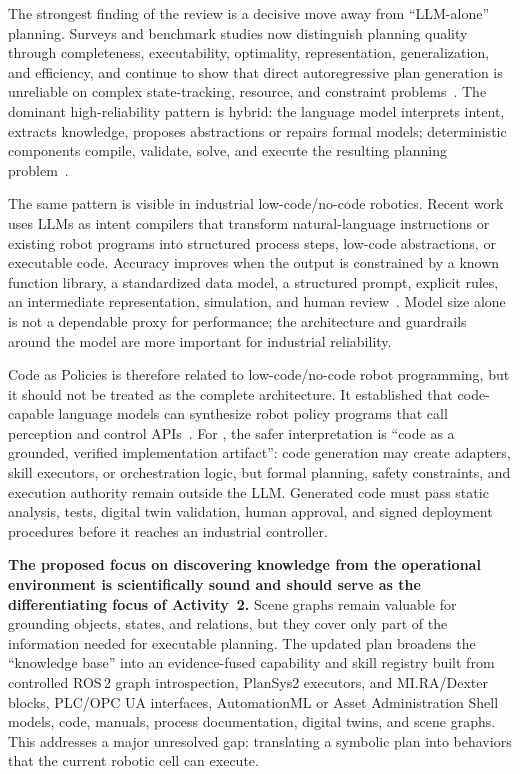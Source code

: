 \documentclass{plan4ari_report}
\begin{document}
The strongest finding of the review is a decisive move away from ``LLM-alone'' planning. Surveys and benchmark studies now distinguish planning quality through completeness, executability, optimality, representation, generalization, and efficiency, and continue to show that direct autoregressive plan generation is unreliable on complex state-tracking, resource, and constraint problems~\cite{zhai2025survey,wei2025modernsurvey,tantakoun2025formalizers,chiari2025planning,kambhampati2024llmmodulo,valmeekam2024lrm}. The dominant high-reliability pattern is hybrid: the language model interprets intent, extracts knowledge, proposes abstractions or repairs formal models; deterministic components compile, validate, solve, and execute the resulting planning problem~\cite{kambhampati2024llmmodulo,liu2023llmp,gestrin2024nl2plan,oswald2024domaingen,kagitha2025challenges,hao2024formalverif,palmieri2026hybrid,chen2025codesymbolic}.

The same pattern is visible in industrial low-code/no-code robotics. Recent work uses LLMs as intent compilers that transform natural-language instructions or existing robot programs into structured process steps, low-code abstractions, or executable code. Accuracy improves when the output is constrained by a known function library, a standardized data model, a structured prompt, explicit rules, an intermediate representation, simulation, and human review~\cite{schenkenfelder2024lowcode,henzel2025nlinput,syniawa2026semiauto,mower2024rosllm}. Model size alone is not a dependable proxy for performance; the architecture and guardrails around the model are more important for industrial reliability.

Code as Policies is therefore related to low-code/no-code robot programming, but it should not be treated as the complete \PlanARI{} architecture. It established that code-capable language models can synthesize robot policy programs that call perception and control APIs~\cite{liang2023cap}. For \PlanARI, the safer interpretation is ``code as a grounded, verified implementation artifact'': code generation may create adapters, skill executors, or orchestration logic, but formal planning, safety constraints, and execution authority remain outside the LLM. Generated code must pass static analysis, tests, digital twin validation, human approval, and signed deployment procedures before it reaches an industrial controller.

\textbf{The proposed focus on discovering knowledge from the operational environment is scientifically sound and should serve as the differentiating focus of Activity~2.} Scene graphs remain valuable for grounding objects, states, and relations, but they cover only part of the information needed for executable planning. The updated plan broadens the ``knowledge base'' into an evidence-fused capability and skill registry built from controlled ROS\,2 graph introspection, PlanSys2 executors, and MI.RA/Dexter blocks, PLC/OPC UA interfaces, AutomationML or Asset Administration Shell models, code, manuals, process documentation, digital twins, and scene graphs. This addresses a major unresolved gap: translating a symbolic plan into behaviors that the current robotic cell can execute.
\end{document}
